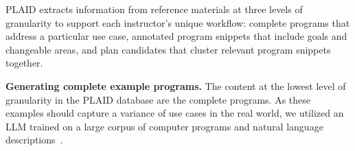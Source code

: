 PLAID extracts information from reference materials at three levels of granularity to support each instructor's unique workflow: complete programs that address a particular use case, annotated program snippets that include goals and changeable areas, and plan candidates that cluster relevant program snippets together.

\textbf{Generating complete example programs.}
The content at the lowest level of granularity in the PLAID database are the complete programs. 
\label{sec:llm-pipeline}
As these examples should capture a variance of use cases in the real world, we utilized an LLM trained on a large corpus of computer programs and natural language descriptions~\cite{liu2023isyourcode}.
